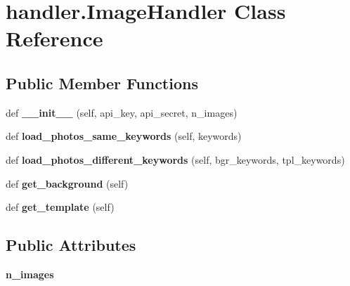 \hypertarget{classhandler_1_1ImageHandler}{}\section{handler.\+Image\+Handler Class Reference}
\label{classhandler_1_1ImageHandler}
\subsection*{Public Member Functions}
\begin{DoxyCompactItemize}
\item 
def {\bfseries \+\_\+\+\_\+init\+\_\+\+\_\+} (self, api\+\_\+key, api\+\_\+secret, n\+\_\+images)\hypertarget{classhandler_1_1ImageHandler_a2c78926beec546e24ce5f2d289e9ca12}{}\label{classhandler_1_1ImageHandler_a2c78926beec546e24ce5f2d289e9ca12}

\item 
def {\bfseries load\+\_\+photos\+\_\+same\+\_\+keywords} (self, keywords)\hypertarget{classhandler_1_1ImageHandler_a05a30b154c7504fa4554f8ebae28d2a3}{}\label{classhandler_1_1ImageHandler_a05a30b154c7504fa4554f8ebae28d2a3}

\item 
def {\bfseries load\+\_\+photos\+\_\+different\+\_\+keywords} (self, bgr\+\_\+keywords, tpl\+\_\+keywords)\hypertarget{classhandler_1_1ImageHandler_a5a74e95e38149018c9b7b1028b3f73df}{}\label{classhandler_1_1ImageHandler_a5a74e95e38149018c9b7b1028b3f73df}

\item 
def {\bfseries get\+\_\+background} (self)\hypertarget{classhandler_1_1ImageHandler_ae9aca7cf6e4171b5b0b2f66ce7c55653}{}\label{classhandler_1_1ImageHandler_ae9aca7cf6e4171b5b0b2f66ce7c55653}

\item 
def {\bfseries get\+\_\+template} (self)\hypertarget{classhandler_1_1ImageHandler_a04135ec9b3d6c423205b154157a3d0bc}{}\label{classhandler_1_1ImageHandler_a04135ec9b3d6c423205b154157a3d0bc}

\end{DoxyCompactItemize}
\subsection*{Public Attributes}
\begin{DoxyCompactItemize}
\item 
{\bfseries n\+\_\+images}\hypertarget{classhandler_1_1ImageHandler_a51827bc086a778bc1baa992215fd2453}{}\label{classhandler_1_1ImageHandler_a51827bc086a778bc1baa992215fd2453}

\end{DoxyCompactItemize}
